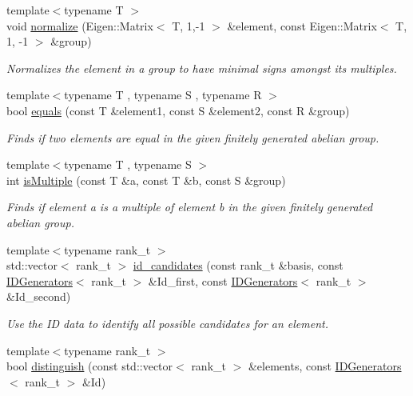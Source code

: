 \begin{DoxyCompactItemize}
{\footnotesize template$<$typename T $>$ }\\void \hyperlink{namespaceMackey_a635c87980358b97256fe159f0c59bb80}{normalize} (Eigen\+::\+Matrix$<$ T, 1,-\/1 $>$ \&element, const Eigen\+::\+Matrix$<$ T, 1, -\/1 $>$ \&group)
\begin{DoxyCompactList}\small\item\em Normalizes the element in a group to have minimal signs amongst its multiples. \end{DoxyCompactList}\item 
{\footnotesize template$<$typename T , typename S , typename R $>$ }\\bool \hyperlink{namespaceMackey_a82dd9e46100ec78b6238a3b60a5b1b45}{equals} (const T \&element1, const S \&element2, const R \&group)
\begin{DoxyCompactList}\small\item\em Finds if two elements are equal in the given finitely generated abelian group. \end{DoxyCompactList}\item 
{\footnotesize template$<$typename T , typename S $>$ }\\int \hyperlink{namespaceMackey_aef81f82c080c97bb31154524af52b62c}{is\+Multiple} (const T \&a, const T \&b, const S \&group)
\begin{DoxyCompactList}\small\item\em Finds if element a is a multiple of element b in the given finitely generated abelian group. \end{DoxyCompactList}\item 
{\footnotesize template$<$typename rank\+\_\+t $>$ }\\std\+::vector$<$ rank\+\_\+t $>$ \hyperlink{namespaceMackey_a83ac78e6d1695af40d0fa58af5255e84}{id\+\_\+candidates} (const rank\+\_\+t \&basis, const \hyperlink{classMackey_1_1IDGenerators}{I\+D\+Generators}$<$ rank\+\_\+t $>$ \&Id\+\_\+first, const \hyperlink{classMackey_1_1IDGenerators}{I\+D\+Generators}$<$ rank\+\_\+t $>$ \&Id\+\_\+second)
\begin{DoxyCompactList}\small\item\em Use the ID data to identify all possible candidates for an element. \end{DoxyCompactList}\item 
{\footnotesize template$<$typename rank\+\_\+t $>$ }\\bool \hyperlink{namespaceMackey_a281b9be315d7d51c7e691d4c733ac0c9}{distinguish} (const std\+::vector$<$ rank\+\_\+t $>$ \&elements, const \hyperlink{classMackey_1_1IDGenerators}{I\+D\+Generators}$<$ rank\+\_\+t $>$ \&Id)

\end{DoxyCompactItemize}
